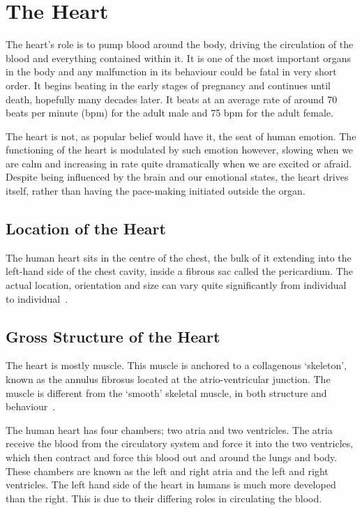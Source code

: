 \section{The Heart}

The heart's role is to pump blood around the body, driving the circulation of
the blood and everything contained within it.  It is one of the most important
organs in the body and any malfunction in its behaviour could be fatal in very
short order.  It begins beating in the early stages of pregnancy and continues
until death, hopefully many decades later.  It beats at an average rate of
around 70 beats per minute (bpm) for the adult male and 75 bpm for the adult
female.

The heart is not, as popular belief would have it, the seat of human emotion.
The functioning of the heart is modulated by such emotion however, slowing when
we are calm and increasing in rate quite dramatically when we are excited or
afraid.  Despite being influenced by the brain and our emotional states, the
heart drives itself, rather than having the pace-making initiated outside the
organ.

\subsection{Location of the Heart}

The human heart sits in the centre of the chest, the bulk of it extending into the
left-hand side of the chest cavity, inside a fibrous sac called the pericardium.
The actual location, orientation and size can vary quite significantly from
individual to individual~\cite{Oberman1967}.


\subsection{Gross Structure of the Heart}

The heart is mostly muscle.
This muscle is anchored to a collagenous `skeleton', known as the annulus
fibrosus located at the atrio-ventricular junction.
The muscle is different from the `smooth' skeletal muscle, in both structure
and behaviour~\cite{Katz2006}.

The human heart has four chambers; two atria and two ventricles.  The atria receive
the blood from the circulatory system and force it into the two ventricles,
which then contract and force this blood out and around the lungs and body.
These chambers are known as the left and right atria and the left and right
ventricles.  The left hand side of the heart in humans is much more developed
than the right.
This is due to their differing roles in circulating the blood.


